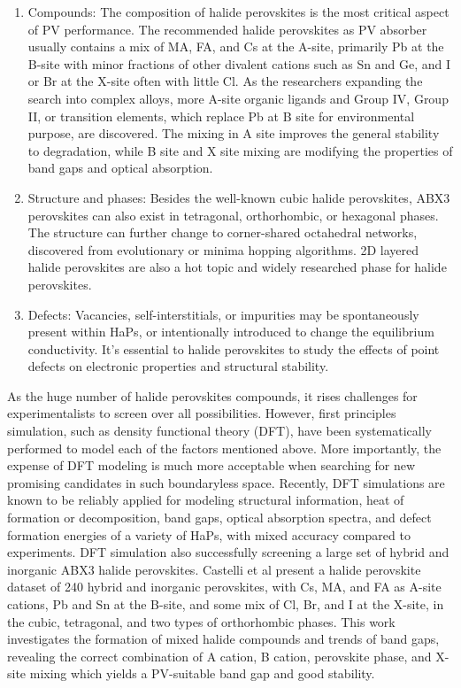 \documentclass[twoside, twocolumn, 9pt, draft]{article}
\begin{document}
\begin{enumerate}
\item Compounds: The composition of halide perovskites is the most
critical aspect of PV performance. The recommended halide
perovskites as PV absorber usually contains a mix of MA, FA, and Cs
at the A-site, primarily Pb at the B-site with minor fractions of
other divalent cations such as Sn and Ge, and I or Br at the X-site
often with little Cl. As the researchers expanding the search into
complex alloys, more A-site organic ligands and Group IV, Group II,
or transition elements, which replace Pb at B site for
environmental purpose, are discovered.\cite{RN18,RN17,RN19,RN11} The mixing in A site
improves the general stability to degradation, while B site and X
site mixing are modifying the properties of band gaps and optical
absorption.
\item Structure and phases: Besides the well-known cubic halide
perovskites, ABX3 perovskites can also exist in tetragonal,
orthorhombic, or hexagonal phases\cite{RN14}. The structure can further
change to corner-shared octahedral networks, discovered from
evolutionary or minima hopping algorithms\cite{RN23}. 2D layered halide
perovskites are also a hot topic and widely researched phase for
halide perovskites.
\item Defects: Vacancies, self-interstitials, or impurities may be
spontaneously present within HaPs, or intentionally introduced to
change the equilibrium conductivity\cite{RN22,RN9}. It’s essential to halide
perovskites to study the effects of point defects on electronic
properties and structural stability.
\end{enumerate}

As the huge number of halide perovskites compounds, it rises
challenges for experimentalists to screen over all
possibilities. However, first principles simulation, such as density
functional theory (DFT), have been systematically performed to model
each of the factors mentioned above. More importantly, the expense of
DFT modeling is much more acceptable when searching for new promising
candidates in such boundaryless space. Recently, DFT simulations are
known to be reliably applied for modeling structural information, heat
of formation or decomposition, band gaps, optical absorption spectra,
and defect formation energies of a variety of HaPs, with mixed
accuracy compared to experiments.\cite{RN9,RN10} DFT simulation also
successfully screening a large set of hybrid and inorganic ABX3 halide
perovskites. Castelli et al \cite{RN16} present a halide perovskite dataset
of 240 hybrid and inorganic perovskites, with Cs, MA, and FA as A-site
cations, Pb and Sn at the B-site, and some mix of Cl, Br, and I at the
X-site, in the cubic, tetragonal, and two types of orthorhombic
phases. This work investigates the formation of mixed halide compounds
and trends of band gaps, revealing the correct combination of A
cation, B cation, perovskite phase, and X-site mixing which yields a
PV-suitable band gap and good stability.
\end{document}

